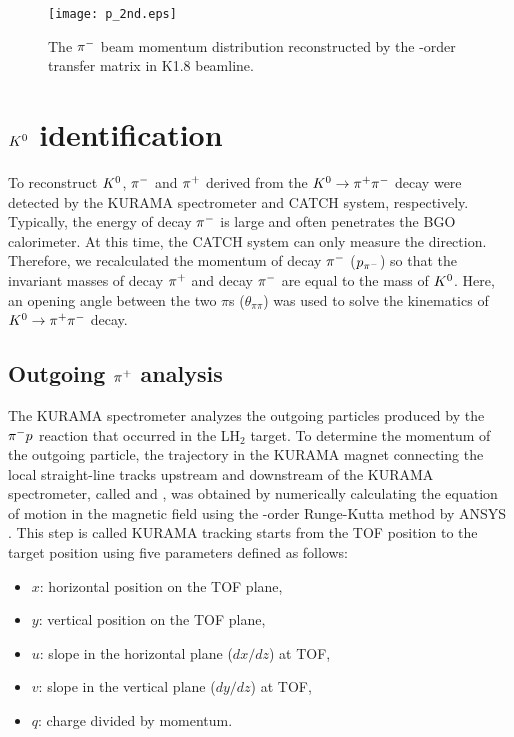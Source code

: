 \begin{figure}[!h]
  \begin{center}
    \texttt{[image: p\_2nd.eps]}
    \caption{The $\pi^{-}$ beam momentum distribution reconstructed by the -order transfer matrix in K1.8 beamline.}
    \label{fig-p_2nd}
  \end{center}
\end{figure}


\clearpage
\section{$K^{0}$ identification}
\label{sec-kzreco}
To reconstruct $K^{0}$, $\pi^{-}$ and $\pi^{+}$ derived from the $K^0 \to \pi^+ \pi^-$ decay were detected by the KURAMA spectrometer and CATCH system, respectively. Typically, the energy of decay $\pi^{-}$ is large and often penetrates the BGO calorimeter. At this time, the CATCH system can only measure the direction. Therefore, we recalculated the momentum of decay $\pi^{-}$ ($p_{\pi^{-}}$) so that the invariant masses of decay $\pi^{+}$ and decay $\pi^{-}$ are equal to the mass of $K^{0}$. Here, an opening angle between the two $\pi$s ($\theta_{\pi\pi}$) was used to solve the kinematics of $K^0 \to \pi^+ \pi^-$ decay.

\subsection{Outgoing $\pi^{+}$ analysis}
The KURAMA spectrometer analyzes the outgoing particles produced by the $\pi^{-} p$ reaction that occurred in the LH$_2$ target. To determine the momentum of the outgoing particle, the trajectory in the KURAMA magnet connecting the local straight-line tracks upstream and downstream of the KURAMA spectrometer, called  and , was obtained by numerically calculating the equation of motion in the magnetic field using the -order Runge-Kutta method by ANSYS \cite{Runge}. This step is called  KURAMA tracking starts from the TOF position to the target position using five parameters defined as follows:
\begin{itemize}
  \item $x$: horizontal position on the TOF plane,
  \item $y$: vertical position on the TOF plane,
  \item $u$: slope in the horizontal plane ($dx/dz$) at TOF,
  \item $v$: slope in the vertical plane ($dy/dz$) at TOF,
  \item $q$: charge divided by momentum.
\end{itemize}

